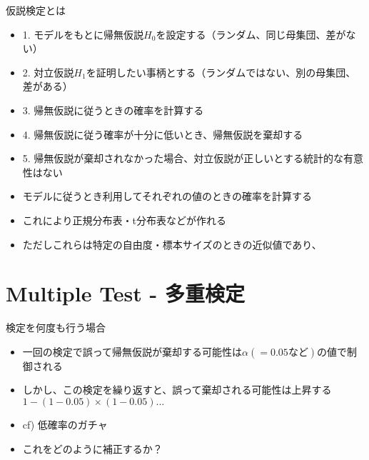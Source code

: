\documentclass[cjk, aspectratio=169]{beamer}
\begin{document}
    \begin{frame}{仮説検定とは}
    \begin{itemize}
    \item 1. モデルをもとに帰無仮説$H_0$を設定する（ランダム、同じ母集団、差がない）
    \item 2. 対立仮説$H_1$を証明したい事柄とする（ランダムではない、別の母集団、差がある）
    \item 3. 帰無仮説に従うときの確率を計算する
    \item 4. 帰無仮説に従う確率が十分に低いとき、帰無仮説を棄却する
    \item 5. 帰無仮説が棄却されなかった場合、対立仮説が正しいとする統計的な有意性はない
    \item モデルに従うとき利用してそれぞれの値のときの確率を計算する
    \item これにより正規分布表・t分布表などが作れる
    \item ただしこれらは特定の自由度・標本サイズのときの近似値であり、
    \end{itemize}
    \end{frame}

\section{Multiple Test - 多重検定}

    \begin{frame}{検定を何度も行う場合}
    \begin{itemize}
    \item 一回の検定で誤って帰無仮説が棄却する可能性は$\alpha(=0.05など)$の値で制御される
    \item しかし、この検定を繰り返すと、誤って棄却される可能性は上昇する $1 - (1-0.05)\times (1-0.05) ...$
    \item cf) 低確率のガチャ
    \item これをどのように補正するか？
    \end{itemize}
    \end{frame}
\end{document}
